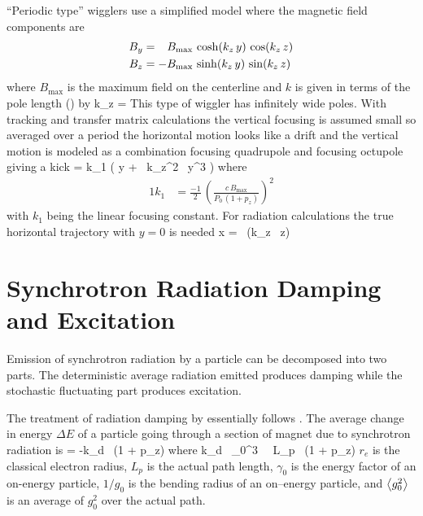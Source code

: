 ``Periodic type'' wigglers use a simplified model where the magnetic
field components are
\begin{alignat}{1}
  B_y &= \hphantom{-} B_{\max} \, \cosh(k_z \, y) \, \cos(k_z \, z) \nonumber \\
  B_z &= -B_{\max} \, \sinh(k_z \, y) \, \sin(k_z \, z) 
\end{alignat}
where $B_{\max}$ is the maximum field on the centerline and $k$ is
given in terms of the pole length () by
\Begineq
  k_z = 
\Endeq
This type of wiggler has infinitely wide poles. With
 tracking and transfer matrix calculations the
vertical focusing is assumed small so averaged over a period the
horizontal motion looks like a drift and the vertical motion is
modeled as a combination focusing quadrupole and focusing octupole
giving a kick\cite{b:corbett}
\Begineq
   = k_1 \left( y +  \, k_z^2 \, y^3 \right)
\Endeq
where
\begin{alignat}{1}
  k_1 &= \frac{-1}{2} \, \left( \frac{c \, B_{\max}}{P_0 \, (1 + p_z)} \right)^2 
\end{alignat}
with $k_1$ being the linear focusing constant. For radiation
calculations the true horizontal trajectory with $y = 0$ is needed
\Begineq
  x =  \, \cos (k_z \, z)
\Endeq

\section{Synchrotron Radiation Damping and Excitation}
\label{s:radiation}

Emission of synchrotron radiation by a particle can be decomposed into
two parts. The deterministic average radiation emitted produces damping
while the stochastic fluctuating part produces excitation\cite{b:jowett}.

The treatment of radiation damping by \bmad essentially follows \mad.
The average change in energy $\Delta E$ of a particle going through a
section of magnet due to synchrotron radiation is
\Begineq
   = -k_d \, (1 + p_z)
\Endeq
where
\Begineq
  k_d \equiv {} \, \gamma_0^3 \,  \, L_p \,  
  (1 + p_z)
  \label{k2r3g}
\Endeq
$r_e$ is the classical electron radius, $L_p$ is the actual path
length, $\gamma_0$ is the energy factor of an on-energy particle, $1/g_0$
is the bending radius of an on--energy particle, and $\left\langle g_0^2 \right\rangle$ is an
average of $g_0^2$ over the actual path.

